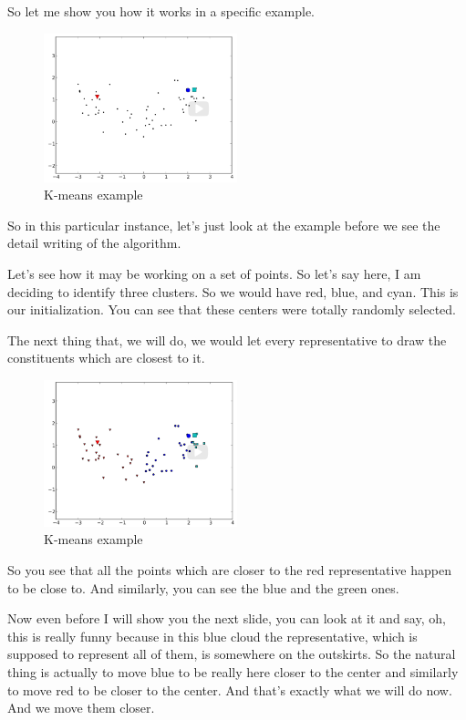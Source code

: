 \documentclass[a4paper, 12pt]{article}
\begin{document}
So let me show you how it works in a specific example.

\begin{figure}[H]
\centering
\includegraphics[width=0.5\textwidth]{./pic/k-means-01.png}
\caption{\label{fig:org0c0099c}K-means example}
\end{figure}

So in this particular instance, let's just look at the example before we see the
detail writing of the algorithm.

Let's see how it may be working on a set of points. So let's say here, I am
deciding to identify three clusters. So we would have red, blue, and cyan. This
is our initialization. You can see that these centers were totally randomly
selected.

The next thing that, we will do, we would let every representative to draw the
constituents which are closest to it.

\begin{figure}[H]
\centering
\includegraphics[width=0.5\textwidth]{./pic/k-means-02.png}
\caption{\label{fig:org92ab1a7}K-means example}
\end{figure}

So you see that all the points which are closer to the red representative happen
to be close to. And similarly, you can see the blue and the green ones.

Now even before I will show you the next slide, you can look at it and say, oh,
this is really funny because in this blue cloud the representative, which is
supposed to represent all of them, is somewhere on the outskirts. So the natural
thing is actually to move blue to be really here closer to the center and
similarly to move red to be closer to the center. And that's exactly what we
will do now. And we move them closer.
\end{document}
